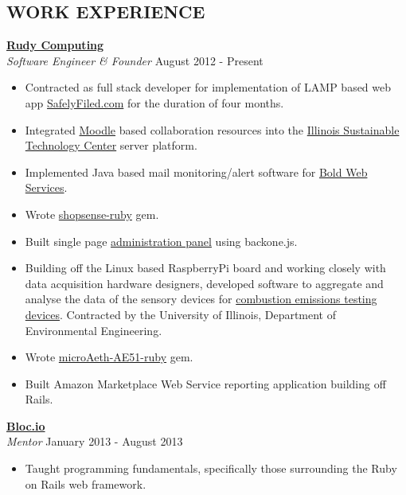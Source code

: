 \documentclass[margin]{res}
\begin{document}
\begin{resume}
\section{ WORK EXPERIENCE} 
  {\bf \href{http://www.rudycomputing.io/}{Rudy Computing}}\\
  {\sl Software Engineer \& Founder} \hfill August 2012 - Present
  
\vspace{-5mm}
  \begin{itemize}
    \itemsep -2pt %
    \item Contracted as full stack developer for implementation of LAMP based web app \href{https://safelyfiled.com/home/}{SafelyFiled.com} for the duration of four months.
    \item Integrated \href{https://moodle.org/}{Moodle} based collaboration resources into the \href{http://www.istc.illinois.edu/}{Illinois Sustainable Technology Center} server platform.
    \item Implemented Java based mail monitoring/alert software for \href{http://www.boldwebservices.com/}{Bold Web Services}.
    \item Wrote \href{http://rudycomputing.github.io/shopsense-ruby/}{shopsense-ruby} gem.
    \item Built single page \href{http://pure-refuge-1784.herokuapp.com/}{administration panel} using backone.js.
    \item Building off the Linux based RaspberryPi board and working closely with data acquisition hardware designers, developed software to aggregate and analyse the data of the sensory devices for \href{https://github.com/RudyComputing/CombustionEmissionsTesting}{combustion emissions testing devices}.  Contracted by the University of Illinois, Department of Environmental Engineering.
    \item Wrote \href{https://github.com/RudyComputing/microAeth-AE51-Ruby}{microAeth-AE51-ruby} gem.
    \item Built Amazon Marketplace Web Service reporting application building off Rails.
  \end{itemize}
 
  {\bf \href{https://www.bloc.io/}{Bloc.io}}\\
  {\sl Mentor} \hfill January 2013 - August 2013
\vspace{-5mm}
    \begin{itemize}  
        \item Taught programming fundamentals, specifically those
        surrounding the Ruby on Rails web framework.
     \end{itemize} 

\end{resume}
\end{document}
